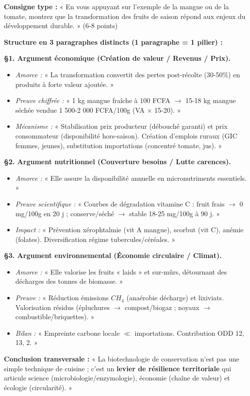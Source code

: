 \documentclass[11pt]{article}
\begin{document}
\begin{methode}
\textbf{Consigne type :} « En vous appuyant sur l'exemple de la mangue ou de la tomate, montrez que la transformation des fruits de saison répond aux enjeux du développement durable. » (6-8 points)

\textbf{Structure en 3 paragraphes distincts (1 paragraphe = 1 pilier) :}

\textbf{§1. Argument économique (Création de valeur / Revenus / Prix).}
\begin{itemize}
    \item \textit{Amorce :} « La transformation convertit des pertes post-récolte (30-50\%) en produits à forte valeur ajoutée. »
    \item \textit{Preuve chiffrée :} « 1 kg mangue fraîche à 100 FCFA $\rightarrow$ 15-18 kg mangue séchée vendue 1 500-2 000 FCFA/100g (VA $\times$ 15-20). »
    \item \textit{Mécanisme :} « Stabilisation prix producteur (débouché garanti) et prix consommateur (disponibilité hors-saison). Création d'emplois ruraux (GIC femmes, jeunes), substitution importations (concentré tomate, jus). »
\end{itemize}

\textbf{§2. Argument nutritionnel (Couverture besoins / Lutte carences).}
\begin{itemize}
    \item \textit{Amorce :} « Elle assure la disponibilité annuelle en micronutriments essentiels. »
    \item \textit{Preuve scientifique :} « Courbes de dégradation vitamine C : fruit frais $\rightarrow$ 0 mg/100g en 20 j ; conserve/séché $\rightarrow$ stable 18-25 mg/100g à 90 j. »
    \item \textit{Impact :} « Prévention xérophtalmie (vit A mangue), scorbut (vit C), anémie (folates). Diversification régime tubercules/céréales. »
\end{itemize}

\textbf{§3. Argument environnemental (Économie circulaire / Climat).}
\begin{itemize}
    \item \textit{Amorce :} « Elle valorise les fruits « laids » et sur-mûrs, détournant des décharges des tonnes de biomasse. »
    \item \textit{Preuve :} « Réduction émissions $CH_4$ (anaérobie décharge) et lixiviats. Valorisation résidus (épluchures $\rightarrow$ compost/biogaz ; noyaux $\rightarrow$ combustible/briquettes). »
    \item \textit{Bilan :} « Empreinte carbone locale $\ll$ importations. Contribution ODD 12, 13, 2. »
\end{itemize}

\textbf{Conclusion transversale :} « La biotechnologie de conservation n'est pas une simple technique de cuisine ; c'est un \textbf{levier de résilience territoriale} qui articule science (microbiologie/enzymologie), économie (chaîne de valeur) et écologie (circularité). »
\end{methode}
\end{document}
